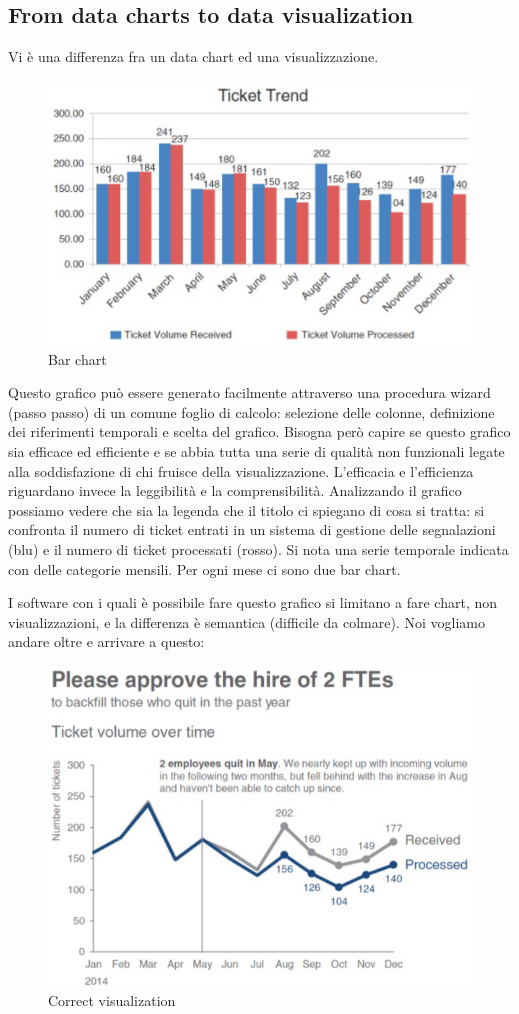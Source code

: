 \documentclass[12pt,a4paper]{report}
\begin{document}
\subsection{From data charts to data visualization}

Vi è una differenza fra un data chart ed una visualizzazione. 

\begin{figure}[h]
	\centering
	\includegraphics[width=.6\textwidth]{imgs datavis/bar charts.png}\hfil
	
	\caption{Bar chart}\label{etichetta}
\end{figure}


Questo grafico può essere generato facilmente attraverso una procedura wizard (passo passo) di un comune foglio di calcolo: selezione delle colonne, definizione dei riferimenti temporali e scelta del grafico.
Bisogna però capire se questo grafico sia efficace ed efficiente e se abbia tutta una serie di qualità non funzionali legate alla soddisfazione di chi fruisce della visualizzazione. L'efficacia e l'efficienza riguardano invece la leggibilità e la comprensibilità. Analizzando il grafico possiamo vedere che sia la legenda che il titolo ci spiegano di cosa si tratta: si confronta il numero di ticket entrati in un sistema di gestione delle segnalazioni (blu) e il numero di ticket processati (rosso). Si nota una serie temporale indicata con delle categorie mensili. Per ogni mese ci sono due bar chart.  

I software con i quali è possibile fare questo grafico si limitano a fare chart, non visualizzazioni, e la differenza è semantica (difficile da colmare). Noi vogliamo andare oltre e arrivare a questo: 
\begin{figure}[h]
	\centering
	\includegraphics[width=.6\textwidth]{imgs datavis/visualization.png}\hfil
	
	\caption{Correct visualization}\label{Bar chart}
\end{figure}
\end{document}
